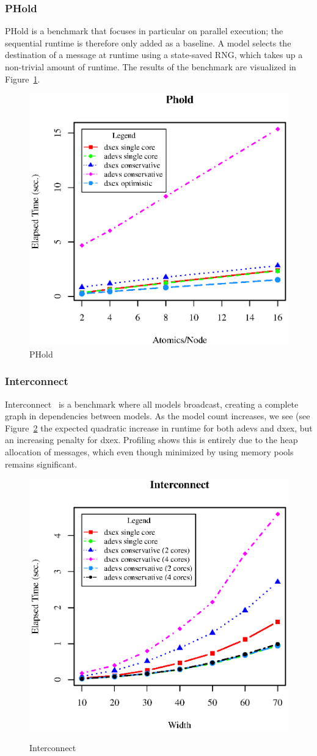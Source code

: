 \subsubsection{PHold}
PHold \cite{PHOLD} is a benchmark that focuses in particular on parallel execution; the sequential runtime is therefore only added as a baseline. A model selects the destination of a message at runtime using a state-saved RNG, which takes up a non-trivial amount of runtime. The results of the benchmark are visualized in Figure~\ref{fig:PHold}.
\begin{figure}[h]
	\includegraphics[width=.5\textwidth]{fig/fig4.eps}
	\caption{PHold}
	\label{fig:PHold}
\end{figure}

\subsubsection{Interconnect}
Interconnect~\cite{van2013research} is a benchmark where all models broadcast, creating a complete graph in dependencies between models. As the model count increases, we see (see Figure~\ref{fig:Interconnect} the expected quadratic increase in runtime for both adevs and dxex, but an increasing penalty for dxex. Profiling shows this is entirely due to the heap allocation of messages, which even though minimized by using memory pools remains significant.
\begin{figure}[h]
	\includegraphics[width=.5\textwidth]{fig/fig3.eps}
	\label{fig3.eps}
	\caption{Interconnect}
	\label{fig:Interconnect}
\end{figure}

